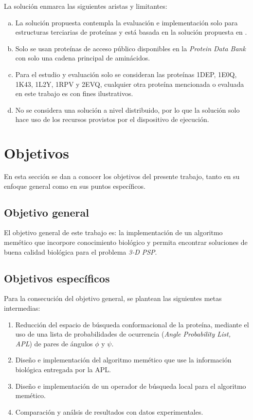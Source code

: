 La solución enmarca las siguientes aristas y limitantes:

\begin{enumerate}[a)]
\item La solución propuesta contempla la evaluación e implementación solo para estructuras terciarias de proteínas y está basada en la solución propuesta en \cite{Dorn:2013}.
\item Solo se usan proteínas de acceso público disponibles en la \textit{Protein Data Bank} con solo una cadena principal de aminácidos.

\item Para el estudio y evaluación solo se consideran las proteínas 1DEP, 1E0Q, 1K43, 1L2Y, 1RPV y 2EVQ, cualquier otra proteína mencionada o evaluada en este trabajo es con fines ilustrativos.

\item No se considera una solución a nivel distribuido, por lo que la solución solo hace uso de los recursos provistos por el dispositivo de ejecución.
\end{enumerate}


\section{Objetivos}
\label{intro:objetivos}

En esta sección se dan a conocer los objetivos del presente trabajo, tanto en su enfoque general como en sus puntos específicos.

\subsection{Objetivo general}

El objetivo general de este trabajo es: la implementación de un algoritmo memético que incorpore conocimiento biológico y permita encontrar soluciones de buena calidad biológica para el problema \textit{3-D PSP}.

\subsection{Objetivos espec\'ificos}

Para la consecución del objetivo general, se plantean las siguientes metas intermedias:

\begin{enumerate}
  \item Reducción del espacio de búsqueda conformacional de la proteína, mediante el uso de una lista de probabilidades de ocurrencia (\textit{Angle Probability List, APL}) de pares de ángulos $\phi$ y $\psi$.
  \item Diseño e implementación del algoritmo memético que use la información biológica entregada por la APL.
  \item Diseño e implementación de un operador de búsqueda local para el algoritmo memético.
  \item Comparación y análsis de resultados con datos experimentales.
\end{enumerate}

